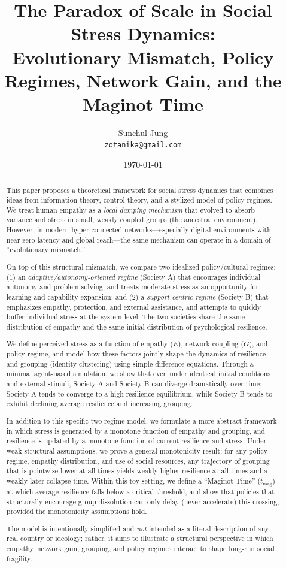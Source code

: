 \documentclass[11pt]{article}
\title{The Paradox of Scale in Social Stress Dynamics:\\
Evolutionary Mismatch, Policy Regimes, Network Gain, and the Maginot Time}
\author{Sunchul Jung\\[4pt]
\small \texttt{zotanika@gmail.com}
}
\date{\today}
\theoremstyle{plain}
\begin{document}
\maketitle

\begin{abstract}
This paper proposes a theoretical framework for social stress dynamics that combines ideas from information theory, control theory, and a stylized model of policy regimes.
We treat human empathy as a \emph{local damping mechanism} that evolved to absorb variance and stress in small, weakly coupled groups (the ancestral environment).
However, in modern hyper-connected networks---especially digital environments with near-zero latency and global reach---the same mechanism can operate in a domain of ``evolutionary mismatch.''

On top of this structural mismatch, we compare two idealized policy/cultural regimes:
(1) an \emph{adaptive/autonomy-oriented regime} (Society A) that encourages individual autonomy and problem-solving, and treats moderate stress as an opportunity for learning and capability expansion; and
(2) a \emph{support-centric regime} (Society B) that emphasizes empathy, protection, and external assistance, and attempts to quickly buffer individual stress at the system level.
The two societies share the same distribution of empathy and the same initial distribution of psychological resilience.

We define perceived stress as a function of empathy ($E$), network coupling ($G$), and policy regime, and model how these factors jointly shape the dynamics of resilience and grouping (identity clustering) using simple difference equations.
Through a minimal agent-based simulation, we show that even under identical initial conditions and external stimuli, Society A and Society B can diverge dramatically over time:
Society A tends to converge to a high-resilience equilibrium, while Society B tends to exhibit declining average resilience and increasing grouping.

In addition to this specific two-regime model, we formulate a more abstract framework in which stress is generated by a monotone function of empathy and grouping, and resilience is updated by a monotone function of current resilience and stress.
Under weak structural assumptions, we prove a general monotonicity result: for any policy regime, empathy distribution, and use of social resources, any trajectory of grouping that is pointwise lower at all times yields weakly higher resilience at all times and a weakly later collapse time.
Within this toy setting, we define a ``Maginot Time'' ($t_{\text{mag}}$) at which average resilience falls below a critical threshold, and show that policies that structurally encourage group dissolution can only delay (never accelerate) this crossing, provided the monotonicity assumptions hold.

The model is intentionally simplified and \emph{not} intended as a literal description of any real country or ideology; rather, it aims to illustrate a structural perspective in which empathy, network gain, grouping, and policy regimes interact to shape long-run social fragility.
\end{abstract}
\end{document}

